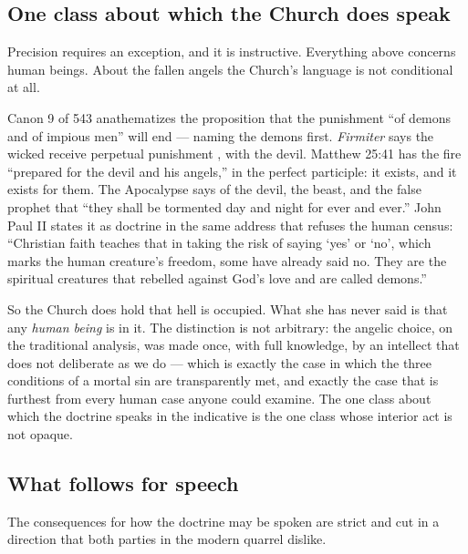 \subsection{One class about which the Church does speak}

Precision requires an exception, and it is instructive. Everything above concerns human beings. About the fallen angels the Church's language is not conditional at all.

Canon 9 of 543 anathematizes the proposition that the punishment ``of demons and of impious men'' will end --- naming the demons first. \emph{Firmiter} says the wicked receive perpetual punishment , with the devil. Matthew 25:41 has the fire ``prepared for the devil and his angels,'' in the perfect participle: it exists, and it exists for them. The Apocalypse says of the devil, the beast, and the false prophet that ``they shall be tormented day and night for ever and ever.'' John Paul II states it as doctrine in the same address that refuses the human census: ``Christian faith teaches that in taking the risk of saying `yes' or `no', which marks the human creature's freedom, some have already said no. They are the spiritual creatures that rebelled against God's love and are called demons.''

So the Church does hold that hell is occupied. What she has never said is that any \emph{human being} is in it. The distinction is not arbitrary: the angelic choice, on the traditional analysis, was made once, with full knowledge, by an intellect that does not deliberate as we do --- which is exactly the case in which the three conditions of a mortal sin are transparently met, and exactly the case that is furthest from every human case anyone could examine. The one class about which the doctrine speaks in the indicative is the one class whose interior act is not opaque.

\subsection{What follows for speech}

The consequences for how the doctrine may be spoken are strict and cut in a direction that both parties in the modern quarrel dislike.

